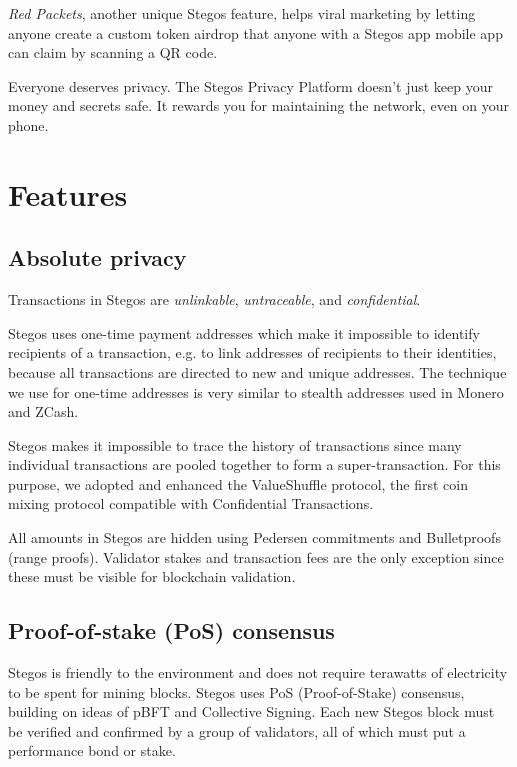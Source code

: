\documentclass[8pt,fleqn,openany]{book}
\begin{document}
\textit{Red Packets}, another unique Stegos feature, helps viral marketing by letting anyone create a custom token airdrop that anyone with a Stegos app mobile app can claim by scanning a QR code.

Everyone deserves privacy. The Stegos Privacy Platform doesn’t just keep your money and secrets safe. It rewards you for maintaining the network, even on your phone.    

\chapter{Features}\label{chap:features}

\section{Absolute privacy}
Transactions in Stegos are \textit{unlinkable}, \textit{untraceable}, and \textit{confidential}.

Stegos uses one-time payment addresses which make it impossible to identify recipients of a transaction, e.g. to link addresses of recipients to their identities, because all transactions are directed to new and unique addresses. The technique we use for one-time addresses is very similar to stealth addresses used in Monero and ZCash.

Stegos makes it impossible to trace the history of transactions since many individual transactions are pooled together to form a super-transaction. For this purpose, we adopted and enhanced the ValueShuffle protocol\cite{c7}, the first coin mixing protocol compatible with Confidential Transactions.

All amounts in Stegos are hidden using Pedersen commitments\cite{c8} and Bulletproofs (range proofs)\cite{c4}. Validator stakes and transaction fees are the only exception since these must be visible for blockchain validation.

\section{Proof-of-stake (PoS) consensus}
Stegos is friendly to the environment and does not require terawatts of electricity to be spent for mining blocks. Stegos uses PoS (Proof-of-Stake) consensus, building on ideas of pBFT\cite{c9} and Collective Signing\cite{c10, c11}. Each new Stegos block must be verified and confirmed by a group of validators, all of which must put a performance bond or stake.
\end{document}
